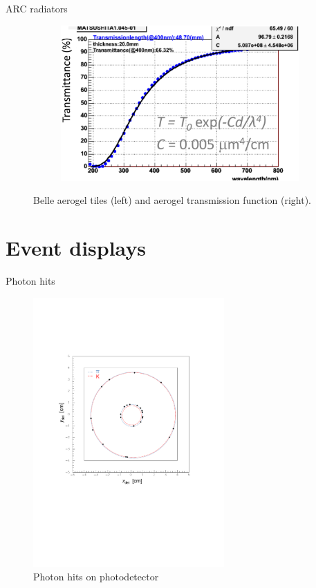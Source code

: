\documentclass{beamer}
\begin{document}
\begin{frame}{ARC radiators}
\begin{figure}
\begin{subfigure}{0.25\textwidth}
    \end{subfigure}%
    \hspace{0.2cm}
    \begin{subfigure}{0.25\textwidth}
      \includegraphics[width = 1.0\textwidth]{Plots/AerogelTransmission.png}
    \end{subfigure}
    \caption{Belle aerogel tiles (left) and aerogel transmission function (right).}
  \end{figure}
\end{frame}

\section{Event displays}
\begin{frame}{Photon hits}
  \begin{figure}
    \centering
    \includegraphics[width = 0.65\textwidth, trim = {2cm 9cm 3cm 6cm}, clip = true]{Plots/Display1.pdf}
    \caption{Photon hits on photodetector}
  \end{figure}
\end{frame}
\end{document}
